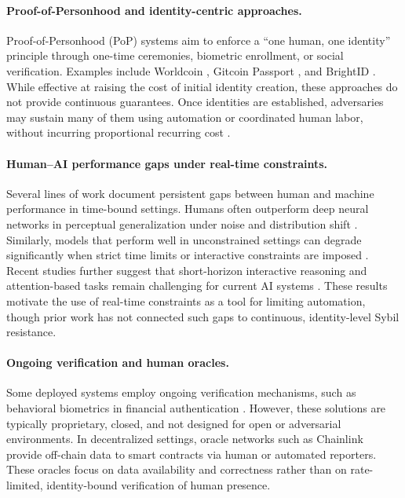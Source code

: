 \documentclass[11pt]{article}
\begin{document}
\paragraph{Proof-of-Personhood and identity-centric approaches.}
Proof-of-Personhood (PoP) systems aim to enforce a ``one human, one identity'' principle through one-time ceremonies, biometric enrollment, or social verification. Examples include Worldcoin \cite{worldcoin2023}, Gitcoin Passport \cite{gitcoin2023}, and BrightID \cite{brightid2022}. While effective at raising the cost of initial identity creation, these approaches do not provide continuous guarantees. Once identities are established, adversaries may sustain many of them using automation or coordinated human labor, without incurring proportional recurring cost \cite{west2020proof}.

\paragraph{Human--AI performance gaps under real-time constraints.}
Several lines of work document persistent gaps between human and machine performance in time-bound settings. Humans often outperform deep neural networks in perceptual generalization under noise and distribution shift \cite{geirhos2018generalisation}. Similarly, models that perform well in unconstrained settings can degrade significantly when strict time limits or interactive constraints are imposed \cite{brendel2019approximating}. Recent studies further suggest that short-horizon interactive reasoning and attention-based tasks remain challenging for current AI systems \cite{schuett2023human}. These results motivate the use of real-time constraints as a tool for limiting automation, though prior work has not connected such gaps to continuous, identity-level Sybil resistance.

\paragraph{Ongoing verification and human oracles.}
Some deployed systems employ ongoing verification mechanisms, such as behavioral biometrics in financial authentication \cite{biometrics2021}. However, these solutions are typically proprietary, closed, and not designed for open or adversarial environments. In decentralized settings, oracle networks such as Chainlink \cite{ellis2017chainlink} provide off-chain data to smart contracts via human or automated reporters. These oracles focus on data availability and correctness rather than on rate-limited, identity-bound verification of human presence.
\end{document}
